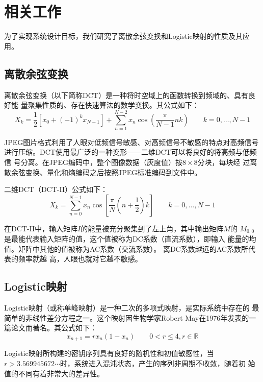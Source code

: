 \section{相关工作}
\label{sec:related-work}
为了实现系统设计目标，我们研究了离散余弦变换和Logistic映射的性质及其应用。

\subsection{离散余弦变换}
离散余弦变换（以下简称DCT）是一种将时空域上的函数转换到频域的、具有良好能
量聚集性质的、存在快速算法的数学变换。其公式如下：
\begin{displaymath}
X_k = \frac1 2 \left[x_0 + \left(-1\right)^k x_{N - 1}\right] + \sum_{n = 1}^{N - 2} x_n \cos \left(
        \frac{\pi} {N - 1} n k \right) \qquad k = 0, \dotsc, N - 1
\end{displaymath}

JPEG图片格式利用了人眼对低频信号敏感、对高频信号不敏感的特点对高频信号
进行压缩。DCT使用最广泛的一种变形——二维DCT可以将良好的将高频与低频信
号分离。在JPEG编码中，整个图像数据（灰度值）按$8 \times 8$分块，每块经
过离散余弦变换、量化和熵编码之后按照JPEG标准编码到文件中。

二维DCT（DCT-II）公式如下：
\begin{displaymath}
X_k = \sum_{n = 0}^{N - 1} x_n \cos \left[\frac{\pi} N \left(n +
        \frac1 2\right) k\right] \qquad k = 0, \dotsc, N - 1
\end{displaymath}

在DCT-II中，输入矩阵$I$的能量被充分聚集到了左上角，其中输出矩阵$M$的
$M_{0, 0}$是最能代表输入矩阵的值，这个值被称为DC系数（直流系数），即输入
能量的均值。矩阵中其他的值被称为AC系数（交流系数）。
离DC系数越远的AC系数所代表的频率就越
高，人眼也就对它越不敏感。



\subsection{Logistic映射}
Logistic映射（或称单峰映射）是一种二次的多项式映射，是实际系统中存在的
最简单的非线性差分方程之一\cite{yang2011}。这个映射因生物学家Robert
May在1976年发表的一篇论文而著名。其公式如下：
\begin{displaymath}
x_{n + 1} = rx_n(1 - x_n) \qquad 0 < r \leq 4, r \in \mathbb{R}
\end{displaymath}

Logistic映射所构建的密钥序列具有良好的随机性和初值敏感性，当$r >
3.569945672\dotsb$时，系统进入混沌状态，产生的序列非周期不收敛，随着初
始值的不同有着非常大的差异性\cite{yang2011}。

